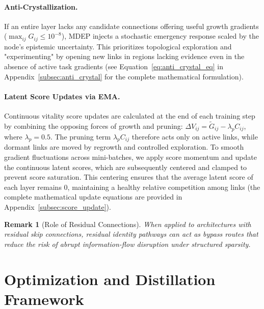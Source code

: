 \documentclass[letterpaper]{article} %
\newtheorem{remark}{Remark}
\begin{document}
\paragraph{Anti-Crystallization.} If an entire layer lacks any candidate connections offering useful growth gradients ($\max_{ij} G_{ij} \le 10^{-8}$), MDEP injects a stochastic emergency response scaled by the node's epistemic uncertainty. This prioritizes topological exploration and "experimenting" by opening new links in regions lacking evidence even in the absence of active task gradients (see Equation~\ref{eq:anti_crystal_eq} in Appendix~\ref{subsec:anti_crystal} for the complete mathematical formulation).

\paragraph{Latent Score Updates via EMA.} Continuous vitality score updates are calculated at the end of each training step by combining the opposing forces of growth and pruning: $\Delta V_{ij} = \tilde{G}_{ij} - \lambda_p C_{ij}$, where $\lambda_p=0.5$. The pruning term $\lambda_p C_{ij}$ therefore acts only on active links, while dormant links are moved by regrowth and controlled exploration. To smooth gradient fluctuations across mini-batches, we apply score momentum and update the continuous latent scores, which are subsequently centered and clamped to prevent score saturation. This centering ensures that the average latent score of each layer remains 0, maintaining a healthy relative competition among links (the complete mathematical update equations are provided in Appendix~\ref{subsec:score_update}).

\begin{remark}[Role of Residual Connections]
When applied to architectures with residual skip connections, residual identity pathways can act as bypass routes that reduce the risk of abrupt information-flow disruption under structured sparsity.
\end{remark}

\section{Optimization and Distillation Framework}\label{sec:optimization}
\end{document}
